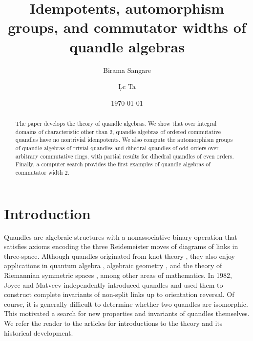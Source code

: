 \documentclass[12 pt]{amsart}
\theoremstyle{definition}
\theoremstyle{remark}
\numberwithin{equation}{section}
\begin{document}
\title[Idempotents, automorphisms, and commutators of quandle algebras]{Idempotents, automorphism groups, and commutator widths of quandle algebras}
\author{Birama Sangare}
\author{L\d\uhorn c Ta}

\date{\today}




\address{Novosibirsk State  University, 2 Pirogova Street, 630090, Novosibirsk, Russia.}

\address{University of Pittsburgh, Pittsburgh, Pennsylvania 15260, United States.}



\begin{abstract} The paper develops the theory of quandle algebras. We show that over integral domains of characteristic other than 2, quandle algebras of ordered commutative quandles have no nontrivial idempotents. We also compute the automorphism groups of quandle algebras of trivial quandles and dihedral quandles of odd orders over arbitrary commutative rings, with partial results for dihedral quandles of even orders. Finally, a computer search provides the first examples of quandle algebras of commutator width 2.
\end{abstract}
\maketitle


\section{Introduction}
Quandles are algebraic structures with a nonassociative binary operation that satisfies axioms encoding the three Reidemeister moves of diagrams of links in three-space. Although quandles originated from knot theory \cite{Joyce, Matveev}, they also enjoy applications in quantum algebra \cite{Andruskiewitsch, BES, Eisermann}, algebraic geometry \cite{LT2}, and the theory of Riemannian symmetric spaces \cite{Loos}, among other areas of mathematics. In 1982, Joyce \cite{Joyce} and Matveev \cite{Matveev} independently introduced quandles and used them to construct complete invariants of non-split links up to orientation reversal. Of course, it is generally difficult to determine whether two quandles are isomorphic. This motivated a search for new properties and invariants of quandles themselves. We refer the reader to the articles \cite{Carter, Kamada, Nelson} for introductions to the theory and its historical development.
\par
\end{document}
